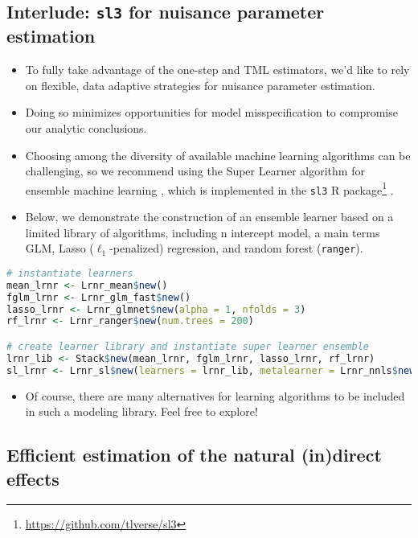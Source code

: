 \documentclass[
  12pt,
]{book}
\newcommand{\passthrough}[1]{#1}
\providecommand{\tightlist}{%
  \setlength{\itemsep}{0pt}\setlength{\parskip}{0pt}}
\renewcommand{\href}[2]{#2\footnote{\url{#1}}}
\theoremstyle{definition}
\theoremstyle{definition}
\theoremstyle{definition}
\newcommand{\1}{\mathbbm{1}}
\begin{document}
\hypertarget{interlude-sl3-for-nuisance-parameter-estimation}{%
\subsection{\texorpdfstring{Interlude: \texttt{sl3} for nuisance parameter estimation}{Interlude: sl3 for nuisance parameter estimation}}\label{interlude-sl3-for-nuisance-parameter-estimation}}

\begin{itemize}
\tightlist
\item
  To fully take advantage of the one-step and TML estimators, we'd like to rely
  on flexible, data adaptive strategies for nuisance parameter estimation.
\item
  Doing so minimizes opportunities for model misspecification to compromise our
  analytic conclusions.
\item
  Choosing among the diversity of available machine learning algorithms can be
  challenging, so we recommend using the Super Learner algorithm for ensemble
  machine learning \citep{vdl2007super}, which is implemented in the \href{https://github.com/tlverse/sl3}{\passthrough{\lstinline!sl3!} R
  package} \citep{coyle2021sl3}.
\item
  Below, we demonstrate the construction of an ensemble learner based on a
  limited library of algorithms, including n intercept model, a main terms GLM,
  Lasso (\(\ell_1\)-penalized) regression, and random forest (\passthrough{\lstinline!ranger!}).
\end{itemize}

\begin{lstlisting}[language=R]
# instantiate learners
mean_lrnr <- Lrnr_mean$new()
fglm_lrnr <- Lrnr_glm_fast$new()
lasso_lrnr <- Lrnr_glmnet$new(alpha = 1, nfolds = 3)
rf_lrnr <- Lrnr_ranger$new(num.trees = 200)

# create learner library and instantiate super learner ensemble
lrnr_lib <- Stack$new(mean_lrnr, fglm_lrnr, lasso_lrnr, rf_lrnr)
sl_lrnr <- Lrnr_sl$new(learners = lrnr_lib, metalearner = Lrnr_nnls$new())
\end{lstlisting}

\begin{itemize}
\tightlist
\item
  Of course, there are many alternatives for learning algorithms to be included
  in such a modeling library. Feel free to explore!
\end{itemize}

\hypertarget{efficient-estimation-of-the-natural-indirect-effects}{%
\subsection{Efficient estimation of the natural (in)direct effects}\label{efficient-estimation-of-the-natural-indirect-effects}}
\end{document}
